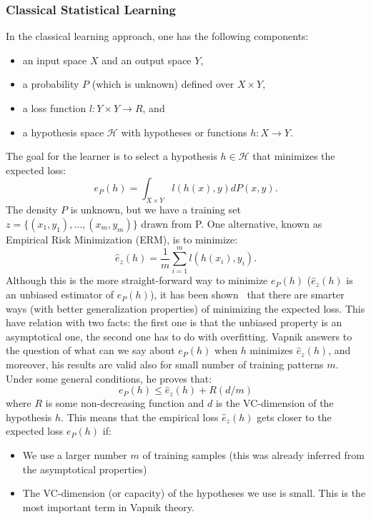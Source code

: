 \subsubsection*{Classical Statistical Learning}
In the classical learning approach, one has the following components:
\begin{itemize}
    \item an input space $X$ and an output space $Y$,
    \item a probability $P$ (which is unknown) defined over $X \times Y$,
    \item a loss function $l:Y \times Y \to R$, and
    \item a hypothesis space $\mathcal{H}$ with hypotheses or functions $h: X \to Y$.
\end{itemize}
The goal for the learner is to select a hypothesis $h \in \mathcal{H}$ that minimizes the expected loss:
$$ e_P(h) =  \int_{X \times Y} l(h(x), y) dP(x, y) .$$
The density $P$ is unknown, but we have a training set $z = \{(x_1, y_1), \ldots, (x_m, y_m)\}$ drawn from P. One alternative, known as Empirical Risk Minimization (ERM), is to minimize:
$$ \hat{e}_z(h) = \frac{1}{m} \sum_{i=1}^m l(h(x_i), y_i).$$
Although this is the more straight-forward way to minimize $e_P(h)$ ($ \hat{e}_z(h)$ is an unbiased estimator of $e_P(h)$), it has been shown~\cite{vapnik2013nature} that there are smarter ways (with better generalization properties) of minimizing the expected loss.
This have relation with two facts: the first one is that the unbiased property is an asymptotical one, the second one has to do with overfitting.
Vapnik answers to the question of what can we say about $e_P(h)$ when $h$ minimizes $\hat{e}_z(h)$, and moreover, his results are valid also for small number of training patterns $m$.
Under some general conditions, he proves that:
\begin{equation}\label{eq:classic_bound}
    e_P(h) \leq \hat{e}_z(h) + R(d/m)
\end{equation}
where $R$ is some non-decreasing function and $d$ is the VC-dimension of the hypothesis $h$. This means that the empirical loss $\hat{e}_z(h)$ gets closer to the expected loss $e_P(h)$ if:
\begin{itemize}
    \item We use a larger number $m$ of training samples (this was already inferred from the asymptotical properties)
    \item The VC-dimension (or capacity) of the hypotheses we use is small. This is the most important term in Vapnik theory.
\end{itemize}
